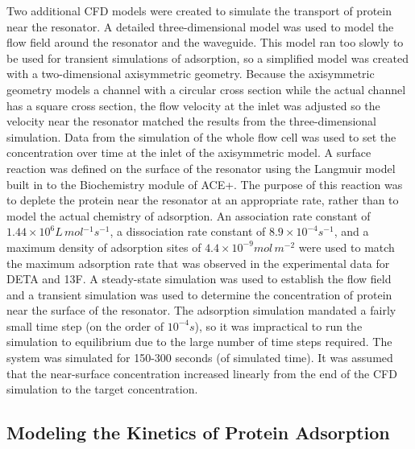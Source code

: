 Two additional CFD models were created to simulate the transport of
protein near the resonator. A detailed three-dimensional model was
used to model the flow field around the resonator and the waveguide.
This model ran too slowly to be used for transient simulations of
adsorption, so a simplified model was created with a two-dimensional
axisymmetric geometry. Because the axisymmetric geometry models a
channel with a circular cross section while the actual channel has
a square cross section, the flow velocity at the inlet was adjusted
so the velocity near the resonator matched the results from the three-dimensional
simulation. Data from the simulation of the whole flow cell was used
to set the concentration over time at the inlet of the axisymmetric
model. A surface reaction was defined on the surface of the resonator
using the Langmuir model built in to the Biochemistry module of ACE+.
The purpose of this reaction was to deplete the protein near the resonator
at an appropriate rate, rather than to model the actual chemistry
of adsorption. An association rate constant of $1.44\times10^{6}L\, mol{}^{-1}s^{-1}$,
a dissociation rate constant of $8.9\times10^{-4}s^{-1}$, and a maximum
density of adsorption sites of $4.4\times10^{-9}mol\, m^{-2}$ were
used to match the maximum adsorption rate that was observed in the
experimental data for DETA and 13F. A steady-state simulation was
used to establish the flow field and a transient simulation was used
to determine the concentration of protein near the surface of the
resonator. The adsorption simulation mandated a fairly small time
step (on the order of $10^{-4}s$), so it was impractical to run the
simulation to equilibrium due to the large number of time steps required.
The system was simulated for 150-300 seconds (of simulated time).
It was assumed that the near-surface concentration increased linearly
from the end of the CFD simulation to the target concentration.


\subsection{Modeling the Kinetics of Protein Adsorption}

